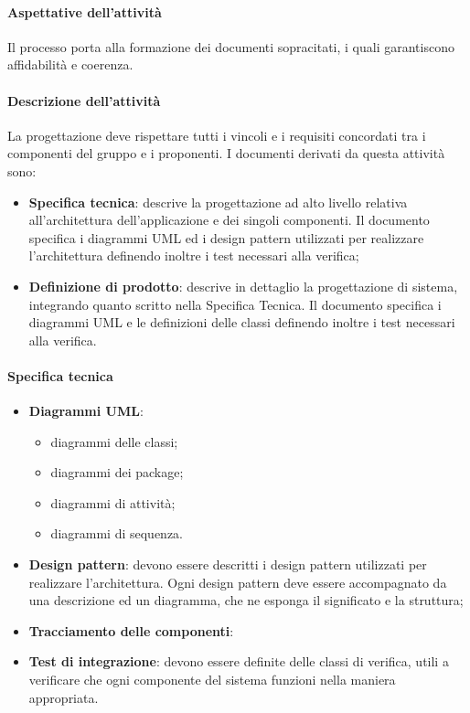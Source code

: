  \paragraph{Aspettative dell'attività}
 Il processo porta alla formazione dei documenti sopracitati, i quali garantiscono affidabilità e
 coerenza.
 \paragraph{Descrizione dell'attività}
 La progettazione deve rispettare tutti i vincoli e i requisiti concordati tra i componenti del gruppo
 e i proponenti. I documenti derivati da questa attività sono:
 \begin{itemize}
 	\item \textbf{Specifica tecnica}: descrive la progettazione ad alto livello relativa all'architettura dell'applicazione
 	e dei singoli componenti. Il documento specifica i diagrammi UML ed i design
 	pattern utilizzati per realizzare l'architettura definendo inoltre i test necessari alla verifica;
 	\item \textbf{Definizione di prodotto}: descrive in dettaglio la progettazione di sistema, integrando
 	quanto scritto nella Specifica Tecnica. Il documento specifica i diagrammi UML e le
 	definizioni delle classi definendo inoltre i test necessari alla verifica.
 \end{itemize}
 \paragraph{Specifica tecnica}
 \begin{itemize} 
 	\item \textbf{Diagrammi UML}:
 	\begin{itemize}
 		\item diagrammi delle classi;
 		\item diagrammi dei package;
 		\item diagrammi di attività;
 		\item diagrammi di sequenza.
 	\end{itemize}
 	\item \textbf{Design pattern}: devono essere descritti i design pattern utilizzati per realizzare l'architettura. Ogni design
 	pattern deve essere accompagnato da una descrizione ed un diagramma, che ne esponga il
 	significato e la struttura;
 	\item \textbf{Tracciamento delle componenti}:
 	\item \textbf{Test di integrazione}: devono essere definite delle classi di verifica, utili a verificare che ogni componente del
 	sistema funzioni nella maniera appropriata.
 \end{itemize}
